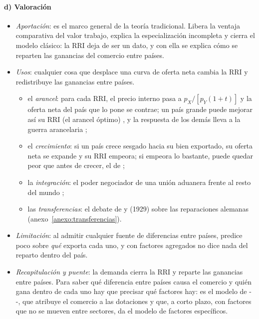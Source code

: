 \documentclass[11pt]{article}
\begin{document}
\paragraph{d) Valoración}

\begin{itemize}
\item \emph{Aportación}: es el marco general de la teoría tradicional. Libera la ventaja comparativa del valor trabajo, explica la especialización incompleta y cierra el modelo clásico: la RRI deja de ser un dato, y con ella se explica cómo se reparten las ganancias del comercio entre países.
\item \emph{Usos}: cualquier cosa que desplace una curva de oferta neta cambia la RRI y redistribuye las ganancias entre países.

  \begin{itemize}
  \item el \emph{arancel}: para cada RRI, el precio interno pasa a $p_X/[p_Y(1+t)]$ y la oferta neta del país que lo pone se contrae; un país grande puede mejorar así su RRI (el arancel óptimo) , y la respuesta de los demás lleva a la guerra arancelaria ;
  \item el \emph{crecimiento}: si un país crece sesgado hacia su bien exportado, su oferta neta se expande y su RRI empeora; si empeora lo bastante, puede quedar peor que antes de crecer, el  de \textcite{Bhagwati1958Immiserizing} ;
  \item la \emph{integración}: el poder negociador de una unión aduanera frente al resto del mundo ;
  \item las \emph{transferencias}: el debate de  y  (1929) sobre las reparaciones alemanas (anexo~\ref{anexo:transferencias}).
  \end{itemize}
\item \emph{Limitación}: al admitir cualquier fuente de diferencias entre países, predice poco sobre \emph{qué} exporta cada uno, y con factores agregados no dice nada del reparto dentro del país.
\item \emph{Recapitulación y puente}: la demanda cierra la RRI y reparte las ganancias entre países. Para saber qué diferencia entre países causa el comercio y quién gana dentro de cada uno hay que precisar qué factores hay: es el modelo de --, que atribuye el comercio a las dotaciones y que, a corto plazo, con factores que no se mueven entre sectores, da el modelo de factores específicos.
\end{itemize}
\end{document}
